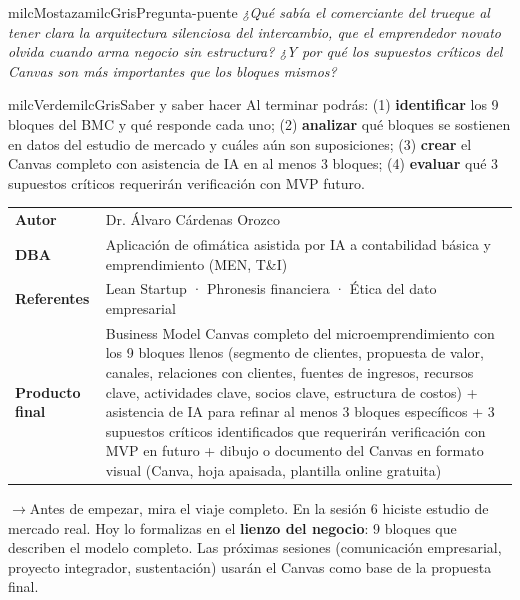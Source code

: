 \documentclass[11pt,letterpaper]{article}
\newcommand{\puente}[1]{%
  \begin{puentebox}%
    \textcolor{milcGradeDark}{$\rightarrow$}\hspace{2mm}#1%
  \end{puentebox}%
}
\begin{document}
\begin{softbox}{milcMostaza}{milcGris}{Pregunta-puente}
\textit{¿Qué sabía el comerciante del trueque al tener clara la arquitectura silenciosa del intercambio, que el emprendedor novato olvida cuando arma negocio sin estructura? ¿Y por qué los \emph{supuestos críticos} del Canvas son más importantes que los bloques mismos?}
\end{softbox}

\begin{softbox}{milcVerde}{milcGris}{Saber y saber hacer}
Al terminar podrás: (1) \textbf{identificar} los 9 bloques del BMC y qué responde cada uno; (2) \textbf{analizar} qué bloques se sostienen en datos del estudio de mercado y cuáles aún son suposiciones; (3) \textbf{crear} el Canvas completo con asistencia de IA en al menos 3 bloques; (4) \textbf{evaluar} qué 3 supuestos críticos requerirán verificación con MVP futuro.
\end{softbox}



\small
\begin{tabularx}{\textwidth}{>{\bfseries}p{3.0cm}Y}
Autor & Dr. Álvaro Cárdenas Orozco\\
DBA & Aplicación de ofimática asistida por IA a contabilidad básica y emprendimiento (MEN, T\&I)\\
Referentes & Lean Startup · Phronesis financiera · Ética del dato empresarial\\
Producto final & Business Model Canvas completo del microemprendimiento con los 9 bloques llenos (segmento de clientes, propuesta de valor, canales, relaciones con clientes, fuentes de ingresos, recursos clave, actividades clave, socios clave, estructura de costos) + asistencia de IA para refinar al menos 3 bloques específicos + 3 supuestos críticos identificados que requerirán verificación con MVP en futuro + dibujo o documento del Canvas en formato visual (Canva, hoja apaisada, plantilla online gratuita)\\
\end{tabularx}
\normalsize

\puente{Antes de empezar, mira el viaje completo. En la sesión 6 hiciste estudio de mercado real. Hoy lo formalizas en el \textbf{lienzo del negocio}: 9 bloques que describen el modelo completo. Las próximas sesiones (comunicación empresarial, proyecto integrador, sustentación) usarán el Canvas como base de la propuesta final.}
\end{document}
